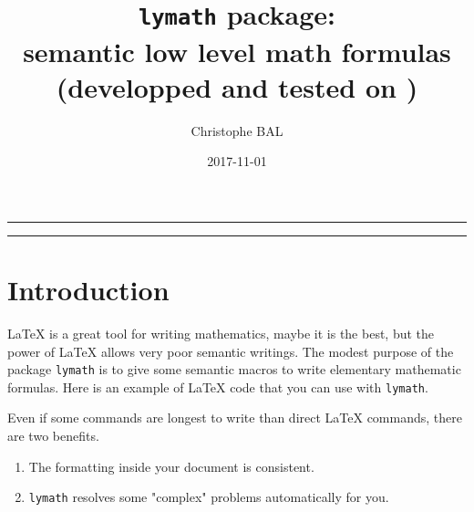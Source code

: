 \documentclass[12pt,a4paper]{article}
\theoremstyle{definition}
\begin{document}
\title{\texttt{lymath} package:\\semantic low level math formulas\\{\footnotesize (developped and tested on \macosxname{})}}
\author{Christophe BAL}
\date{2017-11-01}

\maketitle


\vspace{2em}

\hrule

\tableofcontents

\vspace{1.5em}

\hrule

\newpage



\section{Introduction}

\LaTeX{} is a great tool for writing mathematics, maybe it is the best, but the power of \LaTeX{} allows very poor semantic writings.
The modest purpose of the package \verb+lymath+ is to give some semantic macros to write elementary mathematic formulas.
Here is an example of \LaTeX{} code that you can use with \verb+lymath+.

\begin{tcblisting}{listing only}

Knowing that $\frac{df}{dx}(x) = 4 cos(x^2)$ on $[a ; b]$, we have: 
$\int_a^b cos(x^2) dx = \left[ \frac{1){4} f(x) \right]_a^b$.


Knowing that $\derfrac{f}{x}(x) = 4 cos(x^2)$ on $\intervalC{a}{b}$, we have: 
$\int_a^b cos(x^2) \dd{x} = \hook{\frac{1){4} f(x)}{a}{b}$.
\end{tcblisting}

Even if some commands are longest to write than direct \LaTeX{} commands, there are two benefits.
\begin{enumerate}
	\item The formatting inside your document is consistent.

	\item \verb+lymath+ resolves some "complex" problems automatically for you.
\end{enumerate}
\end{document}
